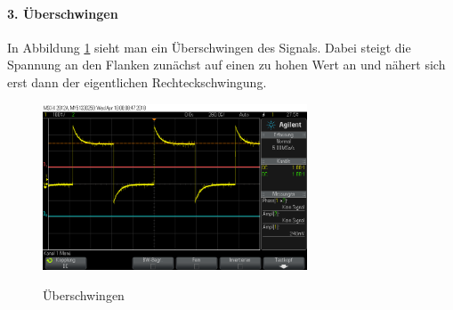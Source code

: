 \documentclass[a4paper]{article}
\begin{document}
    \paragraph{3. Überschwingen}
    In Abbildung \ref{fig:spitze2} sieht man ein Überschwingen des Signals. Dabei steigt die Spannung an den Flanken zunächst auf einen zu hohen Wert an und nähert sich erst dann der eigentlichen Rechteckschwingung.
    \begin{figure}
    \caption{Überschwingen}
    \centering
    \includegraphics[width=0.7\textwidth]{spitze2}
    \label{fig:spitze2}
    \end{figure}
\end{document}

